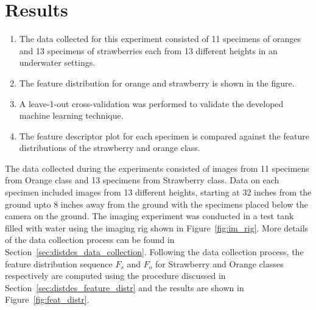 \documentclass {udthesis}
\begin{document}
\section{Results}
\begin{enumerate}
	\item The data collected for this experiment consisted of 11 specimens of oranges and 13 specimens of strawberries each from 13 different heights in an underwater settings.
	
	\item The feature distribution for orange and strawberry is shown in the figure.
	
	\item A leave-1-out cross-validation was performed to validate the developed machine learning technique.
	
	\item The feature descriptor plot for each specimen is compared against the feature distributions of the strawberry and orange class.
\end{enumerate}

The data collected during the experiments consisted of images from 11 specimens from Orange class and 13 specimens from Strawberry class. Data on each specimen included images from 13 different heights, starting at 32 inches from the ground upto 8 inches away from the ground with the specimens placed below the camera on the ground. The imaging experiment was conducted in a test tank filled with water using the imaging rig shown in Figure~\ref{fig:im_rig}. More details of the data collection process can be found in Section~\ref{sec:distdes_data_collection}. Following the data collection process, the feature distribution sequence $F_{s}$ and $F_{o}$ for Strawberry and Orange classes respectively are computed using the procedure discussed in Section~\ref{sec:distdes_feature_distr} and the results are shown in Figure~\ref{fig:feat_distr}.
\end{document}
